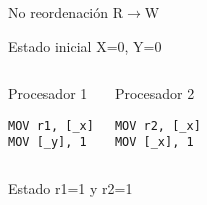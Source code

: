 \begin{frame}[t,fragile]{No reordenación R$\rightarrow$W}

\begin{block}{Estado inicial}
X=0, Y=0
\end{block}


\begin{columns}[T]


\begin{block}{Procesador 1}
\begin{lstlisting}[language={[x86masm]Assembler}]
MOV r1, [_x]
MOV [_y], 1
\end{lstlisting}
\end{block}

\begin{block}{Procesador 2}
\begin{lstlisting}[language={[x86masm]Assembler}]
MOV r2, [_x]
MOV [_x], 1
\end{lstlisting}
\end{block}

\end{columns}


\begin{block}{Estado }
r1=1 y r2=1
\end{block}

\end{frame}


